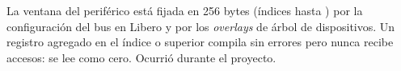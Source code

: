 \begin{advertencia}
La ventana del periférico está fijada en 256 bytes (índices hasta
) por la configuración del bus en Libero y por los
\emph{overlays} de árbol de dispositivos. Un registro agregado en el índice
 o superior compila sin errores pero nunca recibe accesos: se
lee como cero. Ocurrió durante el proyecto.
\end{advertencia}
